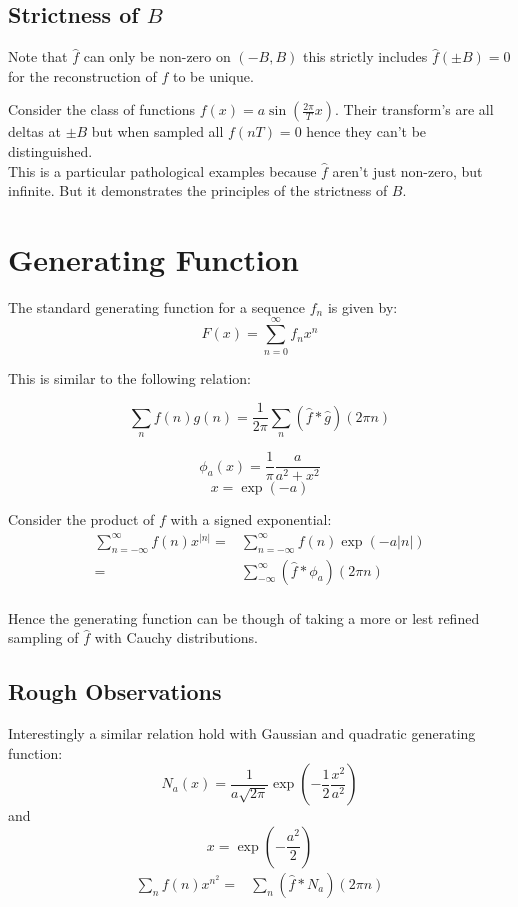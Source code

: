 \subsection{Strictness of $B$}
Note that $\hat{f}$ can only be non-zero on $(-B,B)$ this strictly includes $\hat{f}(\pm B) = 0$ for the reconstruction of $f$ to be unique.

Consider the class of functions $f(x) = a\sin\left(\frac{2\pi}{T}x\right)$.
Their transform's are all deltas at $\pm B$ but when sampled all $f(nT) = 0$ hence they can't be distinguished.
\\

This is a particular pathological examples because $\hat{f}$ aren't just non-zero, but infinite. 
But it demonstrates the principles of the strictness of $B$.

\section{Generating Function}
The standard generating function for a sequence $f_n$ is given by:
\[F(x) = \sum_{n = 0}^{\infty}f_nx^n\]

This is similar to the following relation:

\[\sum_n f(n)g(n) = \frac{1}{2\pi}\sum_n (\hat{f} \ast \hat{g})(2\pi n)\]

\[\phi_a(x) = \frac{1}{\pi}\frac{a}{a^2+x^2}\]
\[x = \exp(-a) \]

Consider the product of $f$ with a signed exponential:
\begin{equation*}
\begin{aligned}
	\sum_{n = -\infty}^{\infty} f(n)x^{|n|} =& \sum_{n = -\infty}^{\infty} f(n)\exp(-a|n|) \\
	= & \sum_{-\infty}^{\infty} (\hat{f}\ast\phi_a)(2\pi n) \\
\end{aligned}
\end{equation*}

Hence the generating function can be though of taking a more or lest refined sampling of $\hat{f}$ with Cauchy distributions. 

\subsection{Rough Observations}
Interestingly a similar relation hold with Gaussian and quadratic generating function:
\[N_a(x) = \frac{1}{a\sqrt{2\pi}}\exp\left(-\frac{1}{2}\frac{x^2}{a^2}\right)\]
and
\[x = \exp\left(-\frac{a^2}{2}\right)\]
\begin{equation*}
\begin{aligned}
	\sum_n f(n) x^{n^2} =& \sum_n (\hat{f} \ast N_a)(2\pi n) \\
\end{aligned}
\end{equation*}
\\

